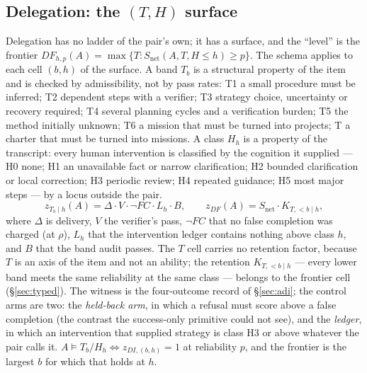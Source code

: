 \subsection{Delegation: the \texorpdfstring{$(T, H)$}{(T, H)} surface}
Delegation has no ladder of the pair's own; it has a surface, and the ``level'' is the frontier $DF_{h,p}(A) = \max\{T : S_{\mathrm{net}}(A, T, H \le h) \ge p\}$. The schema applies to each cell $(b, h)$ of the surface. A band $T_b$ is a structural property of the item and is checked by admissibility, not by pass rates: T1 a small procedure must be inferred; T2 dependent steps with a verifier; T3 strategy choice, uncertainty or recovery required; T4 several planning cycles and a verification burden; T5 the method initially unknown; T6 a mission that must be turned into projects; T\Om{} a charter that must be turned into missions. A class $H_h$ is a property of the transcript: every human intervention is classified by the cognition it supplied --- H0 none; H1 an unavailable fact or narrow clarification; H2 bounded clarification or local correction; H3 periodic review; H4 repeated guidance; H5 most major steps --- by a locus outside the pair.
\[
z_{T_b \mid h}(A) = \Delta \cdot V \cdot \neg FC \cdot L_h \cdot B, \qquad z_{DF}(A) = S_{\mathrm{net}} \cdot K_{T,<b \mid h},
\]
where $\Delta$ is delivery, $V$ the verifier's pass, $\neg FC$ that no false completion was charged (at $\rho$), $L_h$ that the intervention ledger contains nothing above class $h$, and $B$ that the band audit passes. The $T$ cell carries no retention factor, because $T$ is an axis of the item and not an ability; the retention $K_{T,<b\mid h}$ --- every lower band meets the same reliability at the same class --- belongs to the frontier cell (\S\ref{sec:typed}). The witness is the four-outcome record of \S\ref{sec:adi}; the control arms are two: the \emph{held-back arm}, in which a refusal must score above a false completion (the contrast the success-only primitive could not see), and the \emph{ledger}, in which an intervention that supplied strategy is class H3 or above whatever the pair calls it. $A \models T_b/H_h \iff z_{DI,(b,h)} = 1$ at reliability $p$, and the frontier is the largest $b$ for which that holds at $h$.

